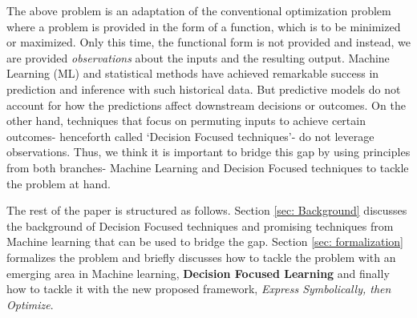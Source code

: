 \documentclass[12pt, letterpaper]{article}
\begin{document}
The above problem is an adaptation of the conventional optimization problem
where a problem is provided in the form of a function, which is to be minimized
or maximized. Only this time, the functional form is not provided and instead,
we are provided \textit{observations} about the inputs and the resulting output.
Machine Learning (ML) and statistical methods have achieved remarkable success
in prediction and inference with such historical data. But predictive models do
not account for how the predictions affect downstream decisions or outcomes. On
the other hand, techniques that focus on permuting inputs to achieve certain
outcomes- henceforth called `Decision Focused techniques'- do not leverage
observations. Thus, we think it is important to bridge this gap by using
principles from both branches- Machine Learning and Decision Focused techniques
to tackle the problem at hand.

The rest of the paper is structured as follows. Section \ref{sec: Background}
discusses the background of Decision Focused techniques and promising techniques
from Machine learning that can be used to bridge the gap. Section \ref{sec:
formalization} formalizes the problem and briefly discusses how to tackle the
problem with an emerging area in Machine learning, \textbf{Decision Focused
Learning} and finally how to tackle it with the new proposed framework,
\textit{Express Symbolically, then Optimize}.
\end{document}
